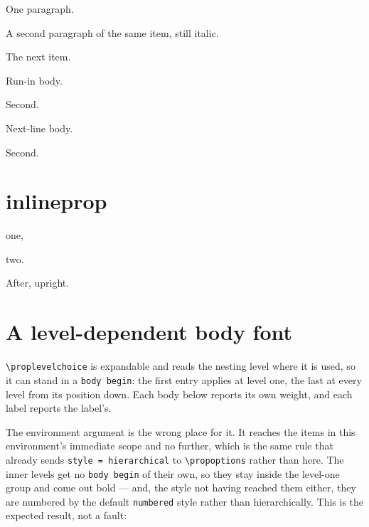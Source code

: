 \documentclass{article}
\begin{document}
\begin{prop}[body begin = \itshape]
  \item One paragraph.

  A second paragraph of the same item, still italic.
  \item The next item.
\end{prop}

\begin{prop}[align=runin, body begin = \itshape]
  \item Run-in body. \item Second.
\end{prop}
\begin{prop}[align=nextline, body begin = \itshape]
  \item Next-line body. \item Second.
\end{prop}

\section{inlineprop}

\begin{inlineprop}[body begin = \itshape]\item one, \item two.\end{inlineprop}
After, upright.

\section{A level-dependent body font}

\makeatletter
\DeclareRobustCommand\wt{[\f@series]}
\makeatother

\verb|\proplevelchoice| is expandable and reads the nesting level where it is
used, so it can stand in a \texttt{body begin}: the first entry applies at level
one, the last at every level from its position down.  Each body below reports
its own weight, and each label reports the label's.

The environment argument is the wrong place for it.  It reaches the items in
this environment's immediate scope and no further, which is the same rule that
already sends \texttt{style\,=\,hierarchical} to \verb|\propoptions| rather than
here.  The inner levels get no \texttt{body begin} of their own, so they stay
inside the level-one group and come out bold --- and, the style not having
reached them either, they are numbered by the default \texttt{numbered} style
rather than hierarchically.  This is the expected result, not a fault:
\end{document}
